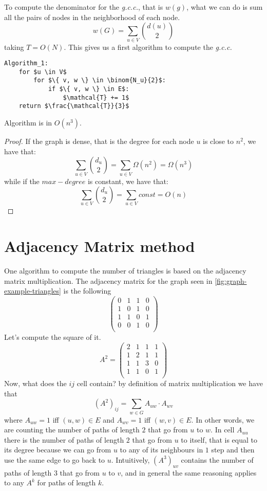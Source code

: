 To compute the denominator for the \emph{g.c.c.}, that is $w(g)$, what we can do is sum all the pairs of nodes in the neighborhood of each node.
\[
	w(G) = \sum_{u \in V}\binom{d(u)}{2}
\]
taking $T = O(N)$.
This gives us a first algorithm to compute the \emph{g.c.c.}
%
\begin{lstlisting}[caption={Algorithm 1}, label={alg:triangles-alg1}]
Algorithm_1:
    for $u \in V$
        for $\{ v, w \} \in \binom{N_u}{2}$:
            if $\{ v, w \} \in E$:
                $\mathcal{T} += 1$
    return $\frac{\mathcal{T}}{3}$
\end{lstlisting}
%
\begin{claim}
	Algorithm is in $O(n^3)$.
\end{claim}
\begin{proof}
	If the graph is dense, that is the degree for each node $u$ is close to $n^2$, we have that:
	\[
		\sum_{u \in V}\binom{d_u}{2} = \sum_{u \in V}\Omega(n^2) = \Omega(n^3)
	\]
	while if the $max-degree$ is constant, we have that:
	\[
		\sum_{u \in V}\binom{d_u}{2} = \sum_{u \in V} const = O(n)
	\]
\end{proof}

\section{Adjacency Matrix method}

One algorithm to compute the number of triangles is based on the adjacency matrix multiplication.
The adjacency matrix for the graph seen in \cref{fig:graph-example-triangles} is the following
\[
	\begin{pmatrix}
		0 & 1 & 1 & 0 \\
		1 & 0 & 1 & 0 \\
		1 & 1 & 0 & 1 \\
		0 & 0 & 1 & 0 \\
	\end{pmatrix}
\]
Let's compute the square of it.
\[
	A^2 = 	\begin{pmatrix}
		2 & 1 & 1 & 1 \\
		1 & 2 & 1 & 1 \\
		1 & 1 & 3 & 0 \\
		1 & 1 & 0 & 1 \\
	\end{pmatrix}
\]
Now, what does the $ij$ cell contain? by definition of matrix multiplication we have that
\[
	(A^2)_{ij} = \sum_{w \in G}A_{uw} \cdot A_{wv}
\]
where $A_{uw} = 1$ iff $(u,w) \in E$ and  $A_{wv} = 1$ iff $(w,v) \in E$. In other words, we are counting the number of paths of length $2$ that go from $u$ to $w$.
In cell $A_{uu}$ there is the number of paths of length $2$ that go from $u$ to itself, that is equal to its degree because we can go from $u$ to any of its neighbours in $1$ step and then use the same edge to go back to $u$.
Intuitively, $(A^3)_{uv}$ contains the number of paths of length $3$ that go from $u$ to $v$, and in general the same reasoning applies to any $A^k$ for paths of length $k$.

